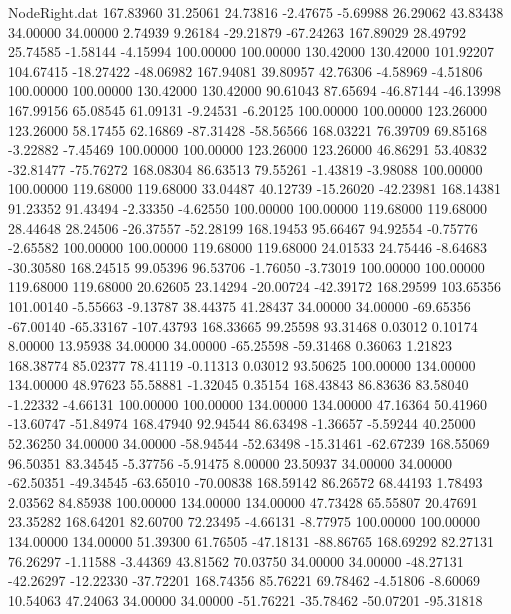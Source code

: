 \begin{filecontents}{NodeRight.dat}
 167.83960   31.25061   24.73816    -2.47675   -5.69988   26.29062   43.83438   34.00000   34.00000    2.74939    9.26184  -29.21879  -67.24263
 167.89029   28.49792   25.74585    -1.58144   -4.15994  100.00000  100.00000  130.42000  130.42000  101.92207  104.67415  -18.27422  -48.06982
 167.94081   39.80957   42.76306    -4.58969   -4.51806  100.00000  100.00000  130.42000  130.42000   90.61043   87.65694  -46.87144  -46.13998
 167.99156   65.08545   61.09131    -9.24531   -6.20125  100.00000  100.00000  123.26000  123.26000   58.17455   62.16869  -87.31428  -58.56566
 168.03221   76.39709   69.85168    -3.22882   -7.45469  100.00000  100.00000  123.26000  123.26000   46.86291   53.40832  -32.81477  -75.76272
 168.08304   86.63513   79.55261    -1.43819   -3.98088  100.00000  100.00000  119.68000  119.68000   33.04487   40.12739  -15.26020  -42.23981
 168.14381   91.23352   91.43494    -2.33350   -4.62550  100.00000  100.00000  119.68000  119.68000   28.44648   28.24506  -26.37557  -52.28199
 168.19453   95.66467   94.92554    -0.75776   -2.65582  100.00000  100.00000  119.68000  119.68000   24.01533   24.75446   -8.64683  -30.30580
 168.24515   99.05396   96.53706    -1.76050   -3.73019  100.00000  100.00000  119.68000  119.68000   20.62605   23.14294  -20.00724  -42.39172
 168.29599  103.65356  101.00140    -5.55663   -9.13787   38.44375   41.28437   34.00000   34.00000  -69.65356  -67.00140  -65.33167 -107.43793
 168.33665   99.25598   93.31468     0.03012    0.10174    8.00000   13.95938   34.00000   34.00000  -65.25598  -59.31468    0.36063    1.21823
 168.38774   85.02377   78.41119    -0.11313    0.03012   93.50625  100.00000  134.00000  134.00000   48.97623   55.58881   -1.32045    0.35154
 168.43843   86.83636   83.58040    -1.22332   -4.66131  100.00000  100.00000  134.00000  134.00000   47.16364   50.41960  -13.60747  -51.84974
 168.47940   92.94544   86.63498    -1.36657   -5.59244   40.25000   52.36250   34.00000   34.00000  -58.94544  -52.63498  -15.31461  -62.67239
 168.55069   96.50351   83.34545    -5.37756   -5.91475    8.00000   23.50937   34.00000   34.00000  -62.50351  -49.34545  -63.65010  -70.00838
 168.59142   86.26572   68.44193     1.78493    2.03562   84.85938  100.00000  134.00000  134.00000   47.73428   65.55807   20.47691   23.35282
 168.64201   82.60700   72.23495    -4.66131   -8.77975  100.00000  100.00000  134.00000  134.00000   51.39300   61.76505  -47.18131  -88.86765
 168.69292   82.27131   76.26297    -1.11588   -3.44369   43.81562   70.03750   34.00000   34.00000  -48.27131  -42.26297  -12.22330  -37.72201
 168.74356   85.76221   69.78462    -4.51806   -8.60069   10.54063   47.24063   34.00000   34.00000  -51.76221  -35.78462  -50.07201  -95.31818

\end{filecontents}

